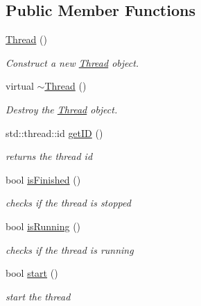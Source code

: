 \subsection*{Public Member Functions}
\begin{DoxyCompactItemize}
\item 
\hyperlink{classow_1_1Thread_a80eff7621e8a69092e564e6a4712d9e4}{Thread} ()\hypertarget{classow_1_1Thread_a80eff7621e8a69092e564e6a4712d9e4}{}\label{classow_1_1Thread_a80eff7621e8a69092e564e6a4712d9e4}

\begin{DoxyCompactList}\small\item\em Construct a new \hyperlink{classow_1_1Thread}{Thread} object. \end{DoxyCompactList}\item 
virtual \hyperlink{classow_1_1Thread_a049ef8a72ff74f421785edbc761f9182}{$\sim$\+Thread} ()\hypertarget{classow_1_1Thread_a049ef8a72ff74f421785edbc761f9182}{}\label{classow_1_1Thread_a049ef8a72ff74f421785edbc761f9182}

\begin{DoxyCompactList}\small\item\em Destroy the \hyperlink{classow_1_1Thread}{Thread} object. \end{DoxyCompactList}\item 
std\+::thread\+::id \hyperlink{classow_1_1Thread_a713b3fd48945071107d0a532dc9fb59e}{get\+ID} ()
\begin{DoxyCompactList}\small\item\em returns the thread id \end{DoxyCompactList}\item 
bool \hyperlink{classow_1_1Thread_aa8297d4d402a2b2722a537808f331d61}{is\+Finished} ()
\begin{DoxyCompactList}\small\item\em checks if the thread is stopped \end{DoxyCompactList}\item 
bool \hyperlink{classow_1_1Thread_ac78a02948059ae0d911efcee2c0853a3}{is\+Running} ()
\begin{DoxyCompactList}\small\item\em checks if the thread is running \end{DoxyCompactList}\item 
bool \hyperlink{classow_1_1Thread_a13f66e05bb62b44d388a71261ecbb167}{start} ()
\begin{DoxyCompactList}\small\item\em start the thread \end{DoxyCompactList}\end{DoxyCompactItemize}
